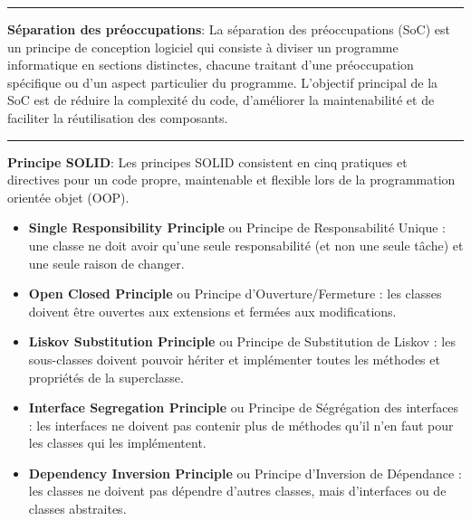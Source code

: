 \begin{center}
\rule{5cm}{0.4pt}
\end{center}

\vspace{0.5cm}

\noindent \textbf{Séparation des préoccupations}:
\noindent La séparation des préoccupations (SoC) est un principe de conception logiciel qui consiste à diviser un programme informatique en sections distinctes, chacune traitant d'une préoccupation spécifique ou d'un aspect particulier du programme. L'objectif principal de la SoC est de réduire la complexité du code, d'améliorer la maintenabilité et de faciliter la réutilisation des composants.

\begin{center}
\rule{5cm}{0.4pt}
\end{center}

\vspace{0.5cm}

\noindent \textbf{Principe SOLID}:
\noindent Les principes SOLID consistent en cinq pratiques et directives pour un code propre, maintenable et flexible lors de la programmation orientée objet (OOP).

\begin{itemize}
	\item \textbf{Single Responsibility Principle} ou Principe de Responsabilité Unique : une classe ne doit avoir qu’une seule responsabilité (et non une seule tâche) et une seule raison de changer.
	\item \textbf{Open Closed Principle} ou Principe d’Ouverture/Fermeture : les classes doivent être ouvertes aux extensions et fermées aux modifications.
	\item \textbf{Liskov Substitution Principle} ou Principe de Substitution de Liskov : les sous-classes doivent pouvoir hériter et implémenter toutes les méthodes et propriétés de la superclasse.
	\item \textbf{Interface Segregation Principle} ou Principe de Ségrégation des interfaces : les interfaces ne doivent pas contenir plus de méthodes qu’il n’en faut pour les classes qui les implémentent.
	\item \textbf{Dependency Inversion Principle} ou Principe d’Inversion de Dépendance : les classes ne doivent pas dépendre d’autres classes, mais d’interfaces ou de classes abstraites.
\end{itemize}

\newpage


